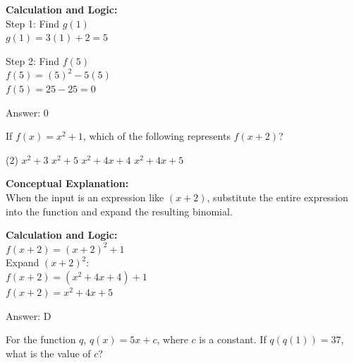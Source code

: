 \documentclass[11pt,paper=a4,answers]{exam}
\begin{document}
\begin{questions}
\begin{solution}
\vspace{20pt}

\textbf{Calculation and Logic:} \\
Step 1: Find $g(1)$ \\
$g(1) = 3(1) + 2 = 5$

\vspace{10pt}

Step 2: Find $f(5)$ \\
$f(5) = (5)^2 - 5(5)$ \\
$f(5) = 25 - 25 = 0$

\vspace{25pt}

Answer: \colorbox{yellow!100}{0}
\end{solution}

\vspace{40pt}

\question
If $f(x) = x^2 + 1$, which of the following represents $f(x+2)$?
\begin{tasks}(2)
    \task $x^2 + 3$
    \task $x^2 + 5$
    \task $x^2 + 4x + 4$
    \task $x^2 + 4x + 5$
\end{tasks}

\begin{solution}
\textbf{Conceptual Explanation:} \\
When the input is an expression like $(x+2)$, substitute the entire expression into the function and expand the resulting binomial.

\vspace{20pt}

\textbf{Calculation and Logic:} \\
$f(x+2) = (x+2)^2 + 1$ \\
Expand $(x+2)^2$: \\
$f(x+2) = (x^2 + 4x + 4) + 1$ \\
$f(x+2) = x^2 + 4x + 5$

\vspace{25pt}

Answer: \colorbox{yellow!100}{D}
\end{solution}

\vspace{40pt}

\question
For the function $q$, $q(x) = 5x + c$, where $c$ is a constant. If $q(q(1)) = 37$, what is the value of $c$?


\end{questions}
\end{document}
